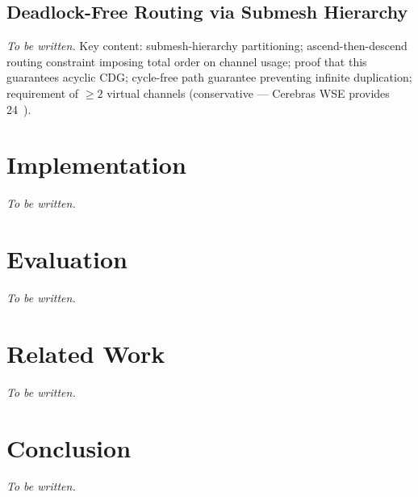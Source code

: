\documentclass[sigplan,anonymous,review,nonacm]{acmart}
\begin{document}
\subsection{Deadlock-Free Routing via Submesh Hierarchy}
\label{sec:design-routing}


\emph{To be written.}
Key content: submesh-hierarchy partitioning; ascend-then-descend routing constraint imposing total order on channel usage; proof that this guarantees acyclic CDG; cycle-free path guarantee preventing infinite duplication; requirement of ${\geq}2$ virtual channels (conservative --- Cerebras WSE provides 24~\cite{cerebras2024sdk}).


\section{Implementation}

\emph{To be written.}

\section{Evaluation}

\emph{To be written.}

\section{Related Work}

\emph{To be written.}

\section{Conclusion}

\emph{To be written.}





\end{document}
